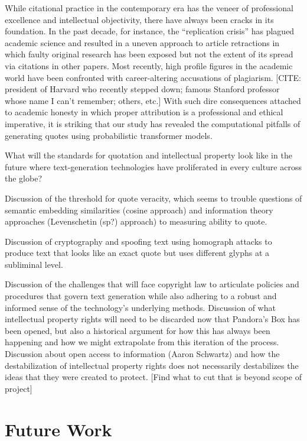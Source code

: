 \documentclass{article}
\begin{document}
While citational practice in the contemporary era has the veneer of professional excellence and intellectual objectivity, there have always been cracks in its foundation. In the past decade, for instance, the “replication crisis” has plagued academic science and resulted in a uneven approach to article retractions in which faulty original research has been exposed but not the extent of its spread via citations in other papers. Most recently, high profile figures in the academic world have been confronted with career-altering accusations of plagiarism. [CITE: president of Harvard who recently stepped down; famous Stanford professor whose name I can’t remember; others, etc.] With such dire consequences attached to academic honesty in which proper attribution is a professional and ethical imperative, it is striking that our study has revealed the computational pitfalls of generating quotes using probabilistic transformer models. 

What will the standards for quotation and intellectual property look like in the future where text-generation technologies have proliferated in every culture across the globe? 

Discussion of the threshold for quote veracity, which seems to trouble questions of semantic embedding similarities (cosine approach) and information theory approaches (Levenschetin (sp?) approach) to measuring ability to quote.

Discussion of cryptography and spoofing text using homograph attacks to produce text that looks like an exact quote but uses different glyphs at a subliminal level.

Discussion of the challenges that will face copyright law to articulate policies and procedures that govern text generation while also adhering to a robust and informed sense of the technology’s underlying methods. Discussion of what intellectual property rights will need to be discarded now that Pandora’s Box has been opened, but also a historical argument for how this has always been happening and how we might extrapolate from this iteration of the process. Discussion about open access to information (Aaron Schwartz) and how the destabilization of intellectual property rights does not necessarily destabilizes the ideas that they were created to protect.
[Find what to cut that is beyond scope of project]


\section{Future Work}
\label{sec:future-work}
\end{document}
